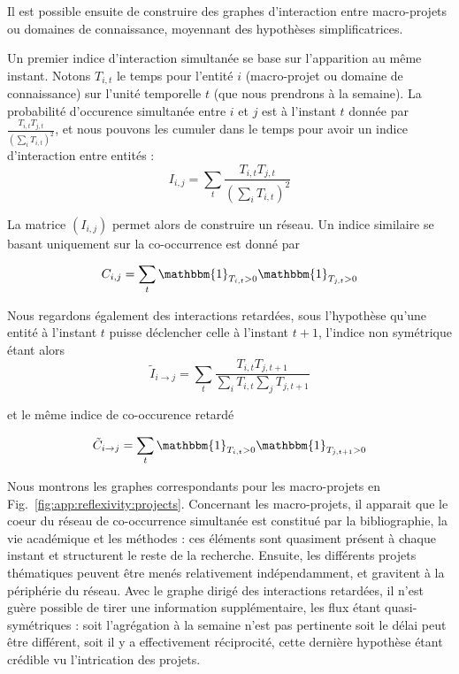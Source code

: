 Il est possible ensuite de construire des graphes d'interaction entre macro-projets ou domaines de connaissance, moyennant des hypothèses simplificatrices.

Un premier indice d'interaction simultanée se base sur l'apparition au même instant. Notons $T_{i,t}$ le temps pour l'entité $i$ (macro-projet ou domaine de connaissance) sur l'unité temporelle $t$ (que nous prendrons à la semaine). La probabilité d'occurence simultanée entre $i$ et $j$ est à l'instant $t$ donnée par $\frac{T_{i,t}T_{j,t}}{\left(\sum_i T_{i,t}\right)^2}$, et nous pouvons les cumuler dans le temps pour avoir un indice d'interaction entre entités :
\[
I_{i,j} = \sum_t \frac{T_{i,t}T_{j,t}}{\left(\sum_i T_{i,t}\right)^2}
\]

La matrice $(I_{i,j})$ permet alors de construire un réseau. Un indice similaire se basant uniquement sur la co-occurrence est donné par

\[
C_{i,j} = \sum_t \mathbbm{1}_{T_{i,t} > 0} \mathbbm{1}_{T_{j,t} > 0}
\]

Nous regardons également des interactions retardées, sous l'hypothèse qu'une entité à l'instant $t$ puisse déclencher celle à l'instant $t+1$, l'indice non symétrique étant alors
\[
\tilde{I}_{i \rightarrow j} = \sum_t \frac{T_{i,t}T_{j,t+1}}{\sum_i T_{i,t}\sum_j T_{j,t+1}}
\]

et le même indice de co-occurence retardé

\[
\tilde{C}_{i\rightarrow j} = \sum_t \mathbbm{1}_{T_{i,t} > 0} \mathbbm{1}_{T_{j,t+1} > 0}
\]


Nous montrons les graphes correspondants pour les macro-projets en Fig.~\ref{fig:app:reflexivity:projects}. Concernant les macro-projets, il apparait que le coeur du réseau de co-occurrence simultanée est constitué par la bibliographie, la vie académique et les méthodes : ces éléments sont quasiment présent à chaque instant et structurent le reste de la recherche. Ensuite, les différents projets thématiques peuvent être menés relativement indépendamment, et gravitent à la périphérie du réseau. Avec le graphe dirigé des interactions retardées, il n'est guère possible de tirer une information supplémentaire, les flux étant quasi-symétriques : soit l'agrégation à la semaine n'est pas pertinente soit le délai peut être différent, soit il y a effectivement réciprocité, cette dernière hypothèse étant crédible vu l'intrication des projets.


